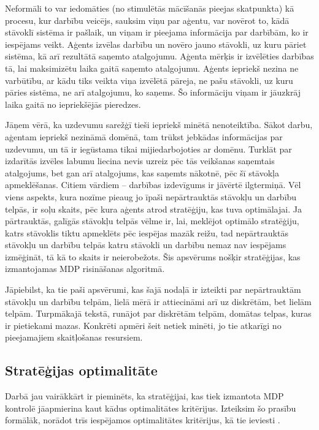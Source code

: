 \documentclass{ludis} %
\begin{document}
Neformāli to var iedomāties (no stimulētās mācīšanās pieejas skatpunkta) kā
procesu, kur darbību veicējs, sauksim viņu par aģentu, var novērot to, kādā
stāvoklī sistēma ir pašlaik, un viņam ir pieejama informācija par darbībām, ko
ir iespējams veikt. Aģents izvēlas darbību un novēro jauno stāvokli, uz kuru
pāriet sistēma, kā arī rezultātā saņemto atalgojumu. Aģenta mērķis ir izvēlēties
darbības tā, lai maksimizētu laika gaitā saņemto atalgojumu. Aģents iepriekš
nezina ne varbūtību, ar kādu tiks veikta viņa izvēlētā pāreja, ne pašu stāvokli,
uz kuru pāries sistēma, ne arī atalgojumu, ko saņems. Šo informāciju viņam ir
jāuzkrāj laika gaitā no iepriekšējās pieredzes.

Jāņem vērā, ka uzdevumu sarežģī tieši iepriekš minētā nenoteiktība. Sākot darbu,
aģentam iepriekš nezināmā domēnā, tam trūkst jebkādas informācijas par uzdevumu,
un tā ir iegūstama tikai mijiedarbojoties ar domēnu. Turklāt par izdarītās
izvēles labumu liecina nevis uzreiz pēc tās veikšanas saņemtais atalgojums, bet
gan arī atalgojums, kas saņemts nākotnē, pēc šī stāvokļa apmeklēšanas. Citiem
vārdiem -- darbības izdevīgums ir jāvērtē ilgtermiņā. Vēl viens aspekts, kura
nozīme pieaug jo īpaši nepārtrauktās stāvokļu un darbību telpās, ir soļu skaits,
pēc kura aģents atrod stratēģiju, kas tuva optimālajai. Ja pārtrauktās, galīgās
stāvokļu telpās vēlme ir, lai, meklējot optimālo stratēģiju, katrs stāvoklis
tiktu apmeklēts pēc iespējas mazāk reižu, tad nepārtrauktās stāvokļu un darbību
telpās katru stāvokli un darbību nemaz nav iespējams izmēģināt, tā kā to skaits
ir neierobežots. Šis apsvērums nošķir stratēģijas, kas izmantojamas MDP
risināšanas algoritmā. %




Jāpiebilst, ka tie paši apsvērumi, kas šajā nodaļā ir izteikti par nepārtrauktām
stāvokļu un darbību telpām, lielā mērā ir attiecināmi arī uz diskrētām, bet
lielām telpām. Turpmākajā tekstā, runājot par diskrētām telpām, domātas
telpas, kuras ir pietiekami mazas. Konkrēti apmēri šeit netiek minēti, jo tie
atkarīgi no pieejamajiem skaitļošanas resursiem.

\subsection{Stratēģijas optimalitāte}
Darbā jau vairākkārt ir pieminēts, ka stratēģijai, kas tiek izmantota MDP
kontrolē jāapmierina kaut kādus optimalitātes kritērijus. Izteiksim šo prasību
formālāk, norādot trīs iespējamos optimalitātes kritērijus, kā tie ieviesti
\autocite{Otterlo}.
\end{document}
